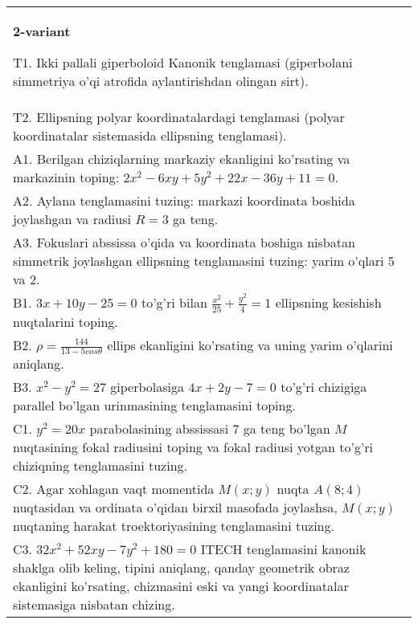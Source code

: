 \documentclass{article}
\begin{document}
\begin{tabular}{m{17cm}}
\textbf{2-variant}
\newline

T1. Ikki pallali giperboloid Kanonik tenglamasi (giperbolani simmetriya o'qi atrofida aylantirishdan olingan sirt).\\

T2. Ellipsning polyar koordinatalardagi tenglamasi (polyar koordinatalar sistemasida ellipsning tenglamasi).\\

A1. Berilgan chiziqlarning markaziy ekanligini ko'rsating va markazinin toping: $2x^{2}-6xy+5y^{2}+22x-36y+11=0$.\\

A2. Aylana tenglamasini tuzing: markazi koordinata boshida joylashgan va radiusi $R=3$ ga teng.\\

A3. Fokuslari abssissa o'qida va koordinata boshiga nisbatan simmetrik joylashgan ellipsning tenglamasini tuzing: yarim o'qlari 5 va 2.\\

B1. $3x + 10y - 25 = 0$ to'g'ri bilan $\frac{x^{2}}{25} + \frac{y^{2}}{4} = 1$ ellipsning kesishish nuqtalarini toping.  \\

B2. $\rho = \frac{144}{13 - 5cos\theta}$ ellips ekanligini ko'rsating va uning yarim o'qlarini aniqlang.\\

B3. $x^{2} - y^{2} = 27$ giperbolasiga $4x + 2y - 7 = 0$ to'g'ri chizigiga parallel bo'lgan urinmasining tenglamasini toping.  \\

C1. $y^{2} = 20x$ parabolasining abssissasi 7 ga teng bo'lgan $M$ nuqtasining fokal radiusini toping va fokal radiusi yotgan to'g'ri chiziqning tenglamasini tuzing.  \\

C2. Agar xohlagan vaqt momentida $M(x;y)$ nuqta $A(8;4)$ nuqtasidan va ordinata o'qidan birxil masofada joylashsa, $M(x;y)$ nuqtaning harakat troektoriyasining tenglamasini tuzing.  \\

C3. $32x^{2} + 52xy - 7y^{2} + 180 = 0$ ITECH tenglamasini kanonik shaklga olib keling, tipini aniqlang, qanday geometrik obraz ekanligini ko'rsating, chizmasini eski va yangi koordinatalar sistemasiga nisbatan chizing.  \\

\end{tabular}
\vspace{1cm}
\end{document}
